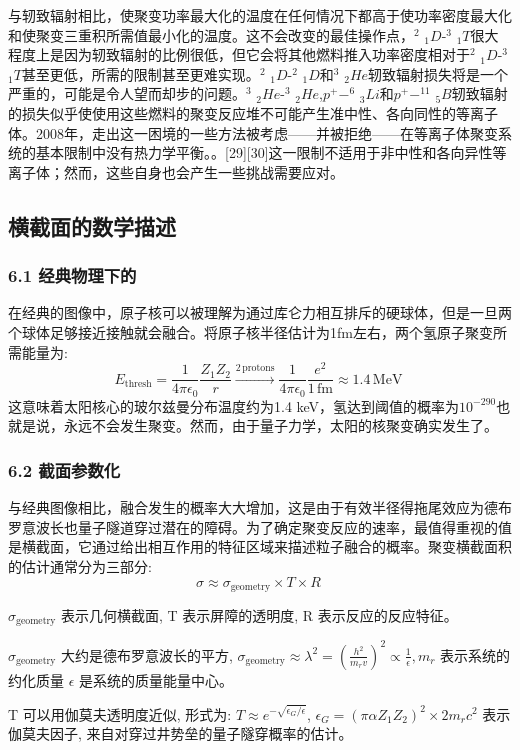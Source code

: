 与轫致辐射相比，使聚变功率最大化的温度在任何情况下都高于使功率密度最大化和使聚变三重积所需值最小化的温度。这不会改变的最佳操作点，$^{2}$ $_{1}D$-$^{3}$ $_{1}T$很大程度上是因为轫致辐射的比例很低，但它会将其他燃料推入功率密度相对于$^{2}$ $_{1}D$-$^{3}$ $_{1}T$甚至更低，所需的限制甚至更难实现。$^{2}$ $_{1}D$-$^{2}$ $_{1}D$和$^{3}$ $_{2}He$轫致辐射损失将是一个严重的，可能是令人望而却步的问题。$^{3}$ $_{2}He$-$^{3}$ $_{2}He$,$p^{+}-^{6}$ $_{3}Li$和$p^{+}-^{11}$ $_{5}B$轫致辐射的损失似乎使使用这些燃料的聚变反应堆不可能产生准中性、各向同性的等离子体。2008年，走出这一困境的一些方法被考虑——并被拒绝——在等离子体聚变系统的基本限制中没有热力学平衡。。[29][30]这一限制不适用于非中性和各向异性等离子体；然而，这些自身也会产生一些挑战需要应对。

\subsection{ 横截面的数学描述}
\subsubsection{6.1 经典物理下的}
在经典的图像中，原子核可以被理解为通过库仑力相互排斥的硬球体，但是一旦两个球体足够接近接触就会融合。将原子核半径估计为1fm左右，两个氢原子聚变所需能量为:
$$E_{\text{thresh}} = \frac{1}{4\pi \epsilon_0} \frac{Z_1 Z_2}{r} \xrightarrow{2 \, \text{protons}} \frac{1}{4\pi \epsilon_0} \frac{e^2}{1 \, \text{fm}} \approx 1.4 \, \text{MeV}~$$
这意味着太阳核心的玻尔兹曼分布温度约为1.4 keV，氢达到阈值的概率为$10^{-290}$也就是说，永远不会发生聚变。然而，由于量子力学，太阳的核聚变确实发生了。
\subsubsection{6.2 截面参数化}
与经典图像相比，融合发生的概率大大增加，这是由于有效半径得拖尾效应为德布罗意波长也量子隧道穿过潜在的障碍。为了确定聚变反应的速率，最值得重视的值是横截面，它通过给出相互作用的特征区域来描述粒子融合的概率。聚变横截面积的估计通常分为三部分:
$$\sigma \approx \sigma_{\text{geometry}} \times T \times R~$$

$\sigma_{\text{geometry}}$ 表示几何横截面, T 表示屏障的透明度, R 表示反应的反应特征。

$\sigma_{\text{geometry}}$ 大约是德布罗意波长的平方, 
$\sigma_{\text{geometry}} \approx \lambda^2 = \left( \frac{h^2}{m_r v} \right)^2 \propto \frac{1}{\epsilon}, 
m_r$ 表示系统的约化质量 $\epsilon$ 是系统的质量能量中心。

T 可以用伽莫夫透明度近似, 形式为: $T \approx e^{-\sqrt{\epsilon_G / \epsilon}}$, 
$\epsilon_G = \left( \pi \alpha Z_1 Z_2 \right)^2 \times 2 m_r c^2$ 表示伽莫夫因子, 来自对穿过井势垒的量子隧穿概率的估计。

